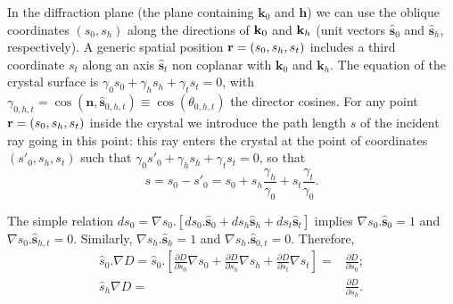 \documentclass[preprint]{iucr}              %
\begin{document}
In the diffraction plane (the plane containing $\textbf{k}_0$ and $\textbf{h}$) 
we can use the oblique coordinates $(s_0,s_h)$ along the directions of $\textbf k_0$ and $\textbf k_h$ (unit vectors $\hat{ \textbf{s}}_{0}$ and $\hat{ \textbf{s}}_{h}$, respectively). A generic spatial position  $\textbf r=(s_0,s_h,s_t)$ includes a third coordinate $s_t$ along an axis $\hat{\textbf{s}}_t$ non coplanar with $\textbf{k}_0$ and $\textbf{k}_h$.
The equation of the crystal surface is $\gamma_0 s_0 + \gamma_h s_h + \gamma_t s_t=0$, with $\gamma_{0,h,t}=\cos(\textbf{n} , \hat{\textbf{s}}_{0,h,t}) \equiv \cos(\theta_{0,h,t})$ the director cosines.
For any point $\textbf r=(s_0,s_h,s_t)$ inside the crystal we introduce the path length $s$ of the incident ray going in this point: this ray enters the crystal at the point of coordinates $(s'_0,s_h,s_t)$ such that $\gamma_0 s'_0+\gamma_h s_h + \gamma_t s_t=0$, so that 
\begin{equation}
\label{eq:s}
s = s_0 - s'_0 = s_0 + s_h \frac{\gamma_h}{\gamma_0} + s_t \frac{\gamma_t}{\gamma_0}.
\end{equation}

The simple relation $d s_0 = \nabla s_0 . [ d s_0 . \hat{\textbf{s}}_0 + d s_h \hat{\textbf{s}}_h + d s_t \hat{\textbf{s}}_t ]$ implies $\nabla s_0 . \hat{\textbf{s}}_0=1$ and $\nabla s_0 . \hat{\textbf{s}}_{h,t}=0$. Similarly, $\nabla s_h . \hat{\textbf{s}}_h=1$ and $\nabla s_h . \hat{\textbf{s}}_{0,t}=0$. Therefore, 
\begin{subequations}
\label{eq:equalities}
\begin{align}
\hat s_0 . \nabla D=
\hat s_0 . \left[ 
\frac{\partial D}{\partial s_0} \nabla s_0 + 
\frac{\partial D}{\partial s_h} \nabla s_h +
\frac{\partial D}{\partial s_t} \nabla s_t
\right] 
=& \frac{\partial D}{\partial s_0}
; \\
\hat s_h \nabla D =& 
\frac{\partial D}{\partial s_h}.
\end{align}
\end{subequations}
\end{document}
